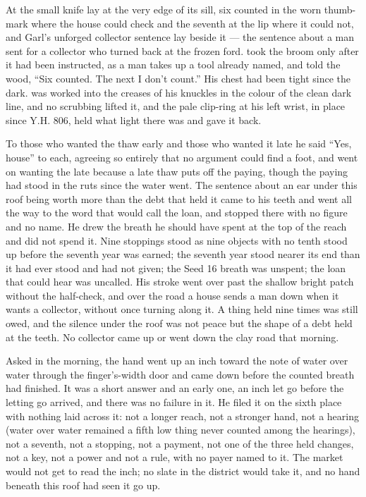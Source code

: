 \scenebreak

At  the small knife lay at the very edge of its sill, six counted in the worn thumb-mark where the house could check and the seventh at the lip where it could not, and Garl's unforged collector sentence lay beside it --- the sentence about a man sent for a collector who turned back at the frozen ford.  took the broom only after it had been instructed, as a man takes up a tool already named, and told the wood, “Six counted. The next I don't count.” His chest had been tight since the dark.  was worked into the creases of his knuckles in the colour of the clean dark line, and no scrubbing lifted it, and the pale clip-ring at his left wrist, in place since Y.H. 806, held what light there was and gave it back.

To those who wanted the thaw early and those who wanted it late he said “Yes, house” to each, agreeing so entirely that no argument could find a foot, and went on wanting the late because a late thaw puts off the paying, though the paying had stood in the ruts since the water went. The sentence about an ear under this roof being worth more than the debt that held it came to his teeth and went all the way to the word that would call the loan, and stopped there with no figure and no name. He drew the breath he should have spent at the top of the reach and did not spend it. Nine stoppings stood as nine objects with no tenth stood up before the seventh year was earned; the seventh year stood nearer its end than it had ever stood and had not given; the Seed 16 breath was unspent; the loan that could hear was uncalled. His stroke went over  past the shallow bright patch without the half-check, and over the road a house sends a man down when it wants a collector, without once turning along it. A thing held nine times was still owed, and the silence under the roof was not peace but the shape of a debt held at the teeth. No collector came up or went down the clay road that morning.

\scenebreak

Asked in the morning, the hand went up an inch toward the note of water over water through the finger's-width door and came down before the counted breath had finished. It was a short answer and an early one, an inch let go before the letting go arrived, and there was no failure in it. He filed it on the sixth place with nothing laid across it: not a longer reach, not a stronger hand, not a hearing (water over water remained a fifth low thing never counted among the hearings), not a seventh, not a stopping, not a payment, not one of the three held changes, not a key, not a power and not a rule, with no payer named to it. The market would not get to read the inch; no slate in the district would take it, and no hand beneath this roof had seen it go up.

